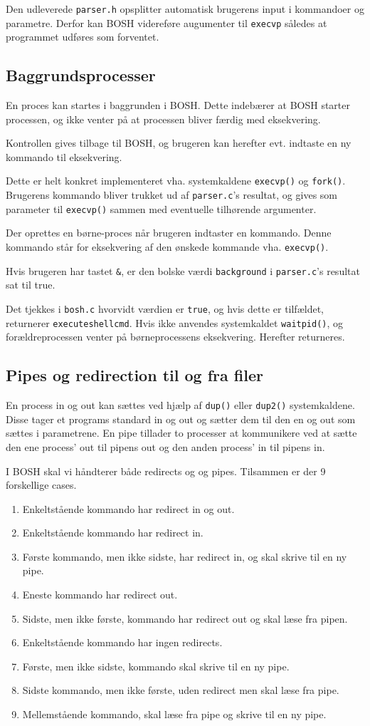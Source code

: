 Den udleverede \verb+parser.h+ opsplitter automatisk brugerens input i kommandoer og parametre. Derfor kan BOSH videreføre augumenter til \verb+execvp+ således at programmet udføres som forventet.
\subsection{Baggrundsprocesser}
En proces kan startes i baggrunden i BOSH. Dette indebærer at BOSH starter processen, og ikke venter på at processen bliver færdig med eksekvering. 

Kontrollen gives tilbage til BOSH, og brugeren kan herefter evt. indtaste en ny kommando til eksekvering. 

Dette er helt konkret implementeret vha. systemkaldene \verb+execvp()+ og \verb+fork()+. Brugerens kommando bliver trukket ud af \verb+parser.c+'s resultat, og gives som parameter til \verb+execvp()+ sammen med eventuelle tilhørende argumenter. 

Der oprettes en børne-proces når brugeren indtaster en kommando. Denne kommando står for eksekvering af den ønskede kommande vha. \verb+execvp()+. 

Hvis brugeren har tastet \verb+&+, er den bolske værdi \verb+background+ i \verb+parser.c+'s resultat sat til true. 

Det tjekkes i \verb+bosh.c+ hvorvidt værdien er \verb+true+, og hvis dette er tilfældet, returnerer \verb+executeshellcmd+. Hvis ikke anvendes systemkaldet \verb+waitpid()+, og forældreprocessen venter på børneprocessens eksekvering. Herefter returneres.
\subsection{Pipes og redirection til og fra filer}
En process in og out kan sættes ved hjælp af \verb+dup()+ eller \verb+dup2()+ systemkaldene. Disse tager et programs standard in og out og sætter dem til den en og out som sættes i parametrene. En pipe tillader to processer at kommunikere ved at sætte den ene process' out til pipens out og den anden process' in til pipens in.

I BOSH skal vi håndterer både redirects og og pipes. Tilsammen er der 9 forskellige cases.
\begin{enumerate}
	\item Enkeltstående kommando har redirect in og out.
	\item Enkeltstående kommando har redirect in.
	\item Første kommando, men ikke sidste, har redirect in, og skal skrive til en ny pipe.
	\item Eneste kommando har redirect out.
	\item Sidste, men ikke første, kommando har redirect out og skal læse fra pipen.
	\item Enkeltstående kommando har ingen redirects.
	\item Første, men ikke sidste, kommando skal skrive til en ny pipe.
	\item Sidste kommando, men ikke første, uden redirect men skal læse fra pipe.
	\item Mellemstående kommando, skal læse fra pipe og skrive til en ny pipe.
\end{enumerate}

